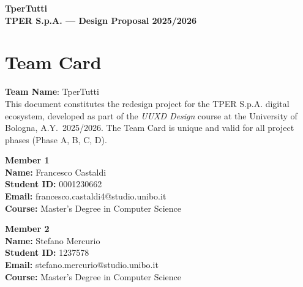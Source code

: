﻿\documentclass[11pt,a4paper]{article}
\begin{document}
\begin{tcolorbox}[colback=primaryColor,colframe=primaryColor,arc=1.5mm,halign=center,valign=center,height=2.5cm]
    \color{white}\LARGE\bfseries\sffamily TperTutti \\[0.2cm]
    \color{white!80}\small\sffamily TPER S.p.A. --- Design Proposal 2025/2026
\end{tcolorbox}

\vspace{0.3cm}

\section*{Team Card}

\vspace{0.2cm}

\begin{tcolorbox}[base]
\small
\textbf{Team Name}: TperTutti \\[6pt]
This document constitutes the redesign project for the TPER S.p.A. digital ecosystem,
developed as part of the \textit{UUXD Design} course at the University of Bologna,
A.Y.\ 2025/2026. The Team Card is unique and valid for all project phases (Phase A, B, C, D).
\end{tcolorbox}

\vspace{0.3cm}

\begin{minipage}[t]{0.48\textwidth}
\begin{tcolorbox}[personabox]
    \textbf{Member 1} \\[4pt]
    \textbf{Name:} Francesco Castaldi \\[2pt]
    \textbf{Student ID:} 0001230662 \\[2pt]
    \textbf{Email:} francesco.castaldi4@studio.unibo.it \\[2pt]
    \textbf{Course:} Master's Degree in Computer Science
\end{tcolorbox}
\end{minipage}
\hfill
\begin{minipage}[t]{0.48\textwidth}
\begin{tcolorbox}[personabox]
    \textbf{Member 2} \\[4pt]
    \textbf{Name:} Stefano Mercurio \\[2pt]
    \textbf{Student ID:} 1237578 \\[2pt]
    \textbf{Email:} stefano.mercurio@studio.unibo.it \\[2pt]
    \textbf{Course:} Master's Degree in Computer Science
\end{tcolorbox}
\end{minipage}
\end{document}
